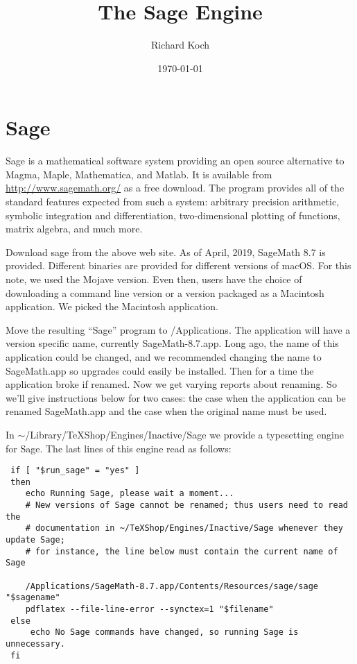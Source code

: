 \documentclass[11pt, oneside]{amsart}
\title{The Sage Engine}
\author{Richard Koch}
\date{\today}
\begin{document}
\maketitle
\vspace{-.3in}
\section{Sage}
Sage is a mathematical software system providing an open source alternative to Magma, Maple, Mathematica, and Matlab. It is available from 
\url{http://www.sagemath.org/} as a free download. The program provides all of the standard features expected from such a system: arbitrary precision arithmetic, symbolic integration and differentiation, two-dimensional plotting of functions, matrix algebra, and much more.

Download sage from the above web site. As of April, 2019, SageMath 8.7 is provided. Different binaries are provided for different versions of macOS. For this note, we used the Mojave version. Even then, users have the choice of downloading a command line version or a version packaged as a Macintosh application. We picked the Macintosh application.

Move the resulting ``Sage'' program to /Applications. The
application will have a version specific name, currently SageMath-8.7.app.  Long ago, the name of this application could be changed, and we recommended changing the name to SageMath.app so upgrades could easily be installed. Then for a time the application broke if renamed. Now we get varying reports about renaming. So we'll give instructions below for two cases: the case when the application can be renamed SageMath.app and the case when the original name must be used.

In $\sim$/Library/TeXShop/Engines/Inactive/Sage we provide a typesetting engine for Sage. The last lines of this engine read as follows:
\begin{verbatim}
 if [ "$run_sage" = "yes" ]
 then
    echo Running Sage, please wait a moment...
    # New versions of Sage cannot be renamed; thus users need to read the
    # documentation in ~/TeXShop/Engines/Inactive/Sage whenever they update Sage;
    # for instance, the line below must contain the current name of Sage
     
    /Applications/SageMath-8.7.app/Contents/Resources/sage/sage "$sagename"
    pdflatex --file-line-error --synctex=1 "$filename"
 else
     echo No Sage commands have changed, so running Sage is unnecessary.	  
 fi
\end{verbatim}
\end{document}
